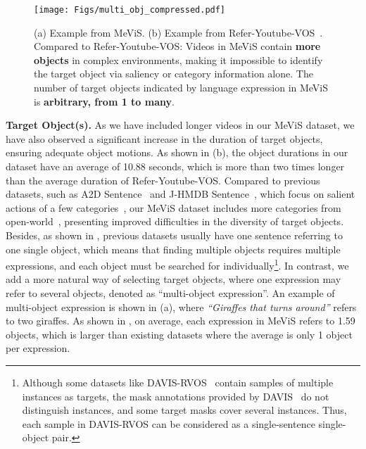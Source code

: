 \documentclass[10pt,twocolumn,letterpaper]{article}
\newcommand{\ourdataset}{MeViS\xspace}
\begin{document}
\begin{figure}
    \centering
    \texttt{[image: Figs/multi\_obj\_compressed.pdf]}
    \vspace{-7.6mm}
    \caption{(a) Example from \ourdataset. (b) Example from Refer-Youtube-VOS~\cite{seo2020urvos}. Compared to Refer-Youtube-VOS:  Videos in \ourdataset contain \textbf{more objects} in complex environments, making it impossible to identify the target object via saliency or category information alone.  The number of target objects indicated by language expression in \ourdataset is \textbf{arbitrary, from 1 to many}.}
    \label{fig:VideoContent}
    \vspace{-3mm}
\end{figure}

\vspace{1mm}
\noindent\textbf{Target Object(s).} As we have included longer videos in our \ourdataset dataset, we have also observed a significant increase in the duration of target objects, ensuring adequate object motions. As shown in (b), the object durations in our dataset have an average of 10.88 seconds, which is more than two times longer than the average duration of Refer-Youtube-VOS. Compared to previous datasets, such as A2D Sentence~\cite{gavrilyuk2018actor} and J-HMDB Sentence~\cite{gavrilyuk2018actor}, which focus on salient actions of a few categories~\cite{seo2020urvos}, our \ourdataset dataset includes more categories from open-world~\cite{UVO,OVIS,MOSE,TAOVOS}, presenting improved difficulties in the diversity of target objects. Besides, as shown in , previous datasets usually have one sentence referring to one single object, which means that finding multiple objects requires multiple expressions, and each object must be searched for individually\footnote{Although some datasets like DAVIS-RVOS~\cite{khoreva2018video} contain samples of multiple instances as targets, the mask annotations provided by DAVIS~\cite{davis2016} do not distinguish instances, and some target masks cover several instances. Thus, each sample in DAVIS-RVOS can be considered as a single-sentence single-object pair.}. In contrast, we add a more natural way of selecting target objects, where one expression may refer to several objects, denoted as ``multi-object expression''. An example of multi-object expression is shown in (a), where \textit{``Giraffes that turns around''} refers to two giraffes. As shown in , on average, each expression in \ourdataset refers to 1.59 objects, which is larger than existing datasets where the average is only 1 object per expression.
\end{document}
